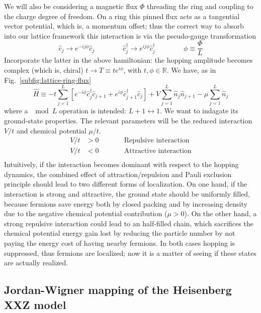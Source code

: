 We will also be considering a magnetic flux $\Phi$ threading the ring and coupling to the charge degree of freedom. On a ring this pinned flux acts as a tangential vector potential, which is, a momentum offset; thus the correct way to absorb into our lattice framework this interaction is via the pseudo-gauge transformation
\[
	\hat c_j \to e^{-ij \phi} \hat c_j
	\qquad\qquad
	\hat c_j^\dagger \to e^{ij \phi} \hat c_j^\dagger
	\qquad\qquad
	\phi \equiv \frac{\Phi}{L}
\]
Incorporate the latter in the above hamiltonian: the hopping amplitude becomes complex (which is, chiral) $t \to T \equiv t e^{i\phi}$, with $t, \phi \in \mathbb{R}$. We have, as in Fig.~\ref{subfig:lattice-ring-flux}
\begin{equation}\label{eq:spinless-hamiltonian-tbc}
	\hat H \equiv -t \sum_{j=1}^L \left[ 
		e^{-i\phi} \hat c_j^\dagger \hat c_{j+1} + e^{i\phi} \hat c_{j+1}^\dagger \hat c_j 
	\right] + V \sum_{j=1}^L \hat n_j \hat n_{j+1} - \mu \sum_{j=1}^L \hat n_j
\end{equation}
where a $\mod L$ operation is intended: $L+1 \leftrightarrow 1$. We want to indagate its ground-state properties. The relevant parameters will be the reduced interaction $V/t$ and chemical potential $\mu/t$.
\[
	\begin{aligned}
		V/t &> 0 \qquad
		&&\text{Repulsive interaction} \\
		V/t &< 0 \qquad
		&&\text{Attractive interaction} \\
	\end{aligned}
\]
Intuitively, if the interaction becomes dominant with respect to the hopping dynamics, the combined effect of attraction/repulsion and Pauli exclusion principle should lead to two different forms of localization. On one hand, if the interaction is strong and attractive, the ground state should be uniformly filled, because fermions save energy both by closed packing and by increasing density due to the negative chemical potential contribution ($\mu > 0$). On the other hand, a strong repulsive interaction could lead to an half-filled chain, which sacrifices the chemical potential energy gain lost by reducing the particle number by not paying the energy cost of having nearby fermions. In both cases hopping is suppressed, thus fermions are localized; now it is a matter of seeing if these states are actually realized.

\subsection{Jordan-Wigner mapping of the Heisenberg XXZ model}

